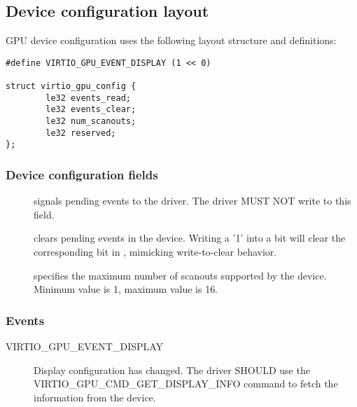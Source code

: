 \subsection{Device configuration layout}\label{sec:Device Types / GPU Device / Device configuration layout}

GPU device configuration uses the following layout structure and
definitions:

\begin{lstlisting}
#define VIRTIO_GPU_EVENT_DISPLAY (1 << 0)

struct virtio_gpu_config {
        le32 events_read;
        le32 events_clear;
        le32 num_scanouts;
        le32 reserved;
};
\end{lstlisting}

\subsubsection{Device configuration fields}

\begin{description}
\item[] signals pending events to the driver.  The
  driver MUST NOT write to this field.
\item[] clears pending events in the device.
  Writing a '1' into a bit will clear the corresponding bit in
  , mimicking write-to-clear behavior.
\item[] specifies the maximum number of scanouts
  supported by the device.  Minimum value is 1, maximum value is 16.
\end{description}

\subsubsection{Events}

\begin{description}
\item[VIRTIO_GPU_EVENT_DISPLAY] Display configuration has changed.
  The driver SHOULD use the VIRTIO_GPU_CMD_GET_DISPLAY_INFO command to
  fetch the information from the device.
\end{description}


